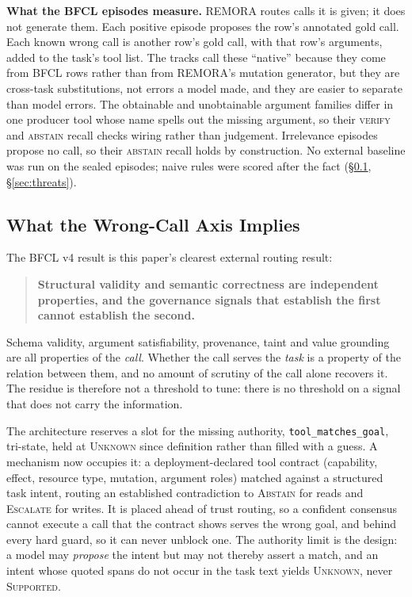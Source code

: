 \documentclass[10pt,twocolumn]{article}
\begin{document}
\textbf{What the BFCL episodes measure.} REMORA routes calls it is given;
it does not generate them. Each positive episode proposes the row's
annotated gold call. Each known wrong call is another row's gold call, with
that row's arguments, added to the task's tool list. The tracks call these
``native'' because they come from BFCL rows rather than from REMORA's
mutation generator, but they are cross-task substitutions, not errors a
model made, and they are easier to separate than model errors. The
obtainable and unobtainable argument families differ in one producer tool
whose name spells out the missing argument, so their \textsc{verify} and
\textsc{abstain} recall checks wiring rather than judgement. Irrelevance
episodes propose no call, so their \textsc{abstain} recall holds by
construction. No external baseline was run on the sealed episodes; naive
rules were scored after the fact (\S\ref{sec:wrongcall-implication},
\S\ref{sec:threats}).

\subsection{What the Wrong-Call Axis Implies}
\label{sec:wrongcall-implication}

The BFCL v4 result is this paper's clearest external routing result:

\begin{quote}
\textbf{Structural validity and semantic correctness are independent
properties, and the governance signals that establish the first cannot
establish the second.}
\end{quote}

Schema validity, argument satisfiability, provenance, taint and value grounding
are all properties of the \emph{call}. Whether the call serves the \emph{task}
is a property of the relation between them, and no amount of scrutiny of the
call alone recovers it. The residue is therefore not a threshold to tune: there
is no threshold on a signal that does not carry the information.

The architecture reserves a slot for the missing authority,
\texttt{tool\_matches\_goal}, tri-state, held at \textsc{Unknown} since
definition rather than filled with a guess. A mechanism now occupies it: a
deployment-declared tool contract (capability, effect, resource type, mutation,
argument roles) matched against a structured task intent, routing an established
contradiction to \textsc{Abstain} for reads and \textsc{Escalate} for writes. It
is placed ahead of trust routing, so a confident consensus cannot execute a call
that the contract shows serves the wrong goal, and behind every hard guard, so it can
never unblock one. The authority limit is the design: a model may \emph{propose}
the intent but may not thereby assert a match, and an intent whose quoted spans
do not occur in the task text yields \textsc{Unknown}, never \textsc{Supported}.
\end{document}
